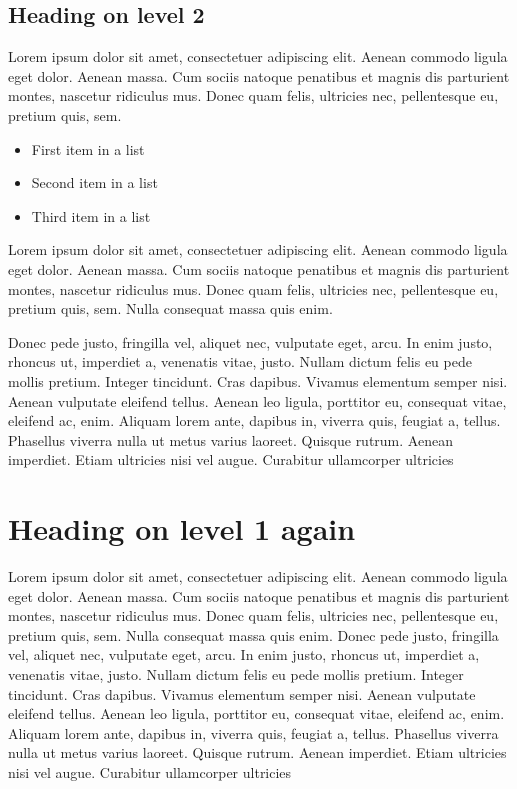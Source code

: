 \documentclass[	DIV=calc,%
							paper=a4,%
							fontsize=11pt,%
							twocolumn]{scrartcl}	 					%
\begin{document}
\subsection*{Heading on level 2}
Lorem ipsum dolor sit amet, consectetuer adipiscing elit. Aenean commodo ligula eget dolor. Aenean massa. Cum sociis natoque penatibus et magnis dis parturient montes, nascetur ridiculus mus. Donec quam felis, ultricies nec, pellentesque eu, pretium quis, sem. 
\begin{itemize}
	\item First item in a list 
	\item Second item in a list 
	\item Third item in a list
\end{itemize}
Lorem ipsum dolor sit amet, consectetuer adipiscing elit. Aenean commodo ligula eget dolor. Aenean massa. Cum sociis natoque penatibus et magnis dis parturient montes, nascetur ridiculus mus. Donec quam felis, ultricies nec, pellentesque eu, pretium quis, sem. Nulla consequat massa quis enim. 

Donec pede justo, fringilla vel, aliquet nec, vulputate eget, arcu. In enim justo, rhoncus ut, imperdiet a, venenatis vitae, justo. Nullam dictum felis eu pede mollis pretium. Integer tincidunt. Cras dapibus. Vivamus elementum semper nisi. Aenean vulputate eleifend tellus. Aenean leo ligula, porttitor eu, consequat vitae, eleifend ac, enim. Aliquam lorem ante, dapibus in, viverra quis, feugiat a, tellus. Phasellus viverra nulla ut metus varius laoreet. Quisque rutrum. Aenean imperdiet. Etiam ultricies nisi vel augue. Curabitur ullamcorper ultricies 

\section*{Heading on level 1 again}
Lorem ipsum dolor sit amet, consectetuer adipiscing elit. Aenean commodo ligula eget dolor. Aenean massa. Cum sociis natoque penatibus et magnis dis parturient montes, nascetur ridiculus mus. Donec quam felis, ultricies nec, pellentesque eu, pretium quis, sem. Nulla consequat massa quis enim. Donec pede justo, fringilla vel, aliquet nec, vulputate eget, arcu. In enim justo, rhoncus ut, imperdiet a, venenatis vitae, justo. Nullam dictum felis eu pede mollis pretium. Integer tincidunt. Cras dapibus. Vivamus elementum semper nisi. Aenean vulputate eleifend tellus. Aenean leo ligula, porttitor eu, consequat vitae, eleifend ac, enim. Aliquam lorem ante, dapibus in, viverra quis, feugiat a, tellus. Phasellus viverra nulla ut metus varius laoreet. Quisque rutrum. Aenean imperdiet. Etiam ultricies nisi vel augue. Curabitur ullamcorper ultricies 
\end{document}
